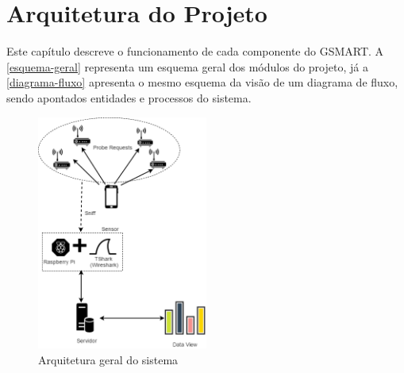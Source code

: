 \chapter{Arquitetura do Projeto}
\label{arq-cap}
Este capítulo descreve o funcionamento de cada componente do GSMART. A
\autoref{esquema-geral} representa um esquema geral dos módulos do projeto, já a
\autoref{diagrama-fluxo} apresenta o mesmo esquema da visão de um diagrama de
fluxo, sendo apontados entidades e processos do sistema.

\begin{figure}[!h]
  \caption{\label{esquema-geral}Arquitetura geral do sistema}
  \begin{center}
    \includegraphics[width=0.50\textwidth]{img/esquema_geral.png}
  \end{center}
\end{figure}

